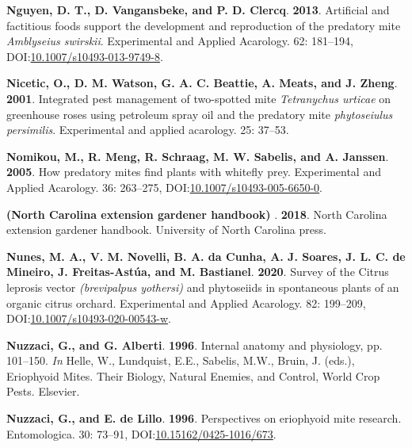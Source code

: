 \documentclass[12pt,final,CPage]{ufthesis}
\newlength{\cslhangindent}
\newenvironment{CSLReferences}[2] %
{%
	\setlength{\parindent}{0pt}
	\ifodd #1 \everypar{\setlength{\hangindent}{\cslhangindent}}\ignorespaces\fi
	\ifnum #2 > 0
	\setlength{\parskip}{#2\baselineskip}
	\fi
}%
{}
\begin{document}
{\begin{CSLReferences}{1}{0}
  \leavevmode{}%
  \textbf{Nguyen, D. T., D. Vangansbeke, and P. D. Clercq}. \textbf{2013}. Artificial and factitious foods support the development and reproduction of the predatory mite {\emph{Amblyseius swirskii}}. Experimental and Applied Acarology. 62: 181--194, DOI:\href{https://doi.org/10.1007/s10493-013-9749-8}{10.1007/s10493-013-9749-8}.

  \leavevmode{}%
  \textbf{Nicetic, O., D. M. Watson, G. A. C. Beattie, A. Meats, and J. Zheng}. \textbf{2001}. Integrated pest management of two-spotted mite {\emph{Tetranychus urticae}} on greenhouse roses using petroleum spray oil and the predatory mite \emph{phytoseiulus persimilis}. Experimental and applied acarology. 25: 37--53.

  \leavevmode{}%
  \textbf{Nomikou, M., R. Meng, R. Schraag, M. W. Sabelis, and A. Janssen}. \textbf{2005}. How predatory mites find plants with whitefly prey. Experimental and Applied Acarology. 36: 263--275, DOI:\href{https://doi.org/10.1007/s10493-005-6650-0}{10.1007/s10493-005-6650-0}.

  \leavevmode{}%
  \textbf{({North Carolina} extension gardener handbook) }. \textbf{2018}. {North Carolina} extension gardener handbook. University of {North Carolina} press.

  \leavevmode{}%
  \textbf{Nunes, M. A., V. M. Novelli, B. A. da Cunha, A. J. Soares, J. L. C. de Mineiro, J. Freitas-Astúa, and M. Bastianel}. \textbf{2020}. Survey of the {Citrus leprosis} vector \emph{(brevipalpus yothersi)} and phytoseiids in spontaneous plants of an organic citrus orchard. Experimental and Applied Acarology. 82: 199--209, DOI:\href{https://doi.org/10.1007/s10493-020-00543-w}{10.1007/s10493-020-00543-w}.

  \leavevmode{}%
  \textbf{Nuzzaci, G., and G. Alberti}. \textbf{1996}. Internal anatomy and physiology, pp. 101--150. \emph{In} Helle, W., Lundquist, E.E., Sabelis, M.W., Bruin, J. (eds.), Eriophyoid Mites. Their Biology, Natural Enemies, and Control, World Crop Pests. Elsevier.

  \leavevmode{}%
  \textbf{Nuzzaci, G., and E. de Lillo}. \textbf{1996}. Perspectives on eriophyoid mite research. Entomologica. 30: 73--91, DOI:\href{https://doi.org/10.15162/0425-1016/673}{10.15162/0425-1016/673}.


\end{CSLReferences}}
\end{document}
